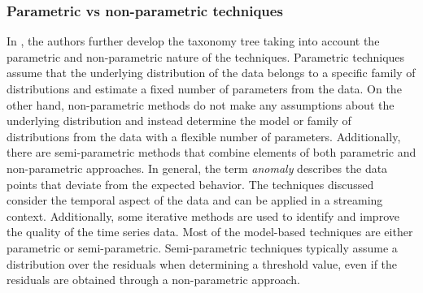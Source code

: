 \subsubsection{Parametric vs non-parametric techniques}
In \cite{blazquez2020review}, the authors further develop the taxonomy tree taking into account the parametric and non-parametric nature of the techniques. Parametric techniques assume that the underlying distribution of the data belongs to a specific family of distributions and estimate a fixed number of parameters from the data. On the other hand, non-parametric methods do not make any assumptions about the underlying distribution and instead determine the model or family of distributions from the data with a flexible number of parameters. Additionally, there are semi-parametric methods that combine elements of both parametric and non-parametric approaches. In general, the term \textit{anomaly} describes the data points that deviate from the expected behavior. The techniques discussed consider the temporal aspect of the data and can be applied in a streaming context. Additionally, some iterative methods are used to identify and improve the quality of the time series data. Most of the model-based techniques are either parametric or semi-parametric. Semi-parametric techniques typically assume a distribution over the residuals when determining a threshold value, even if the residuals are obtained through a non-parametric approach.

